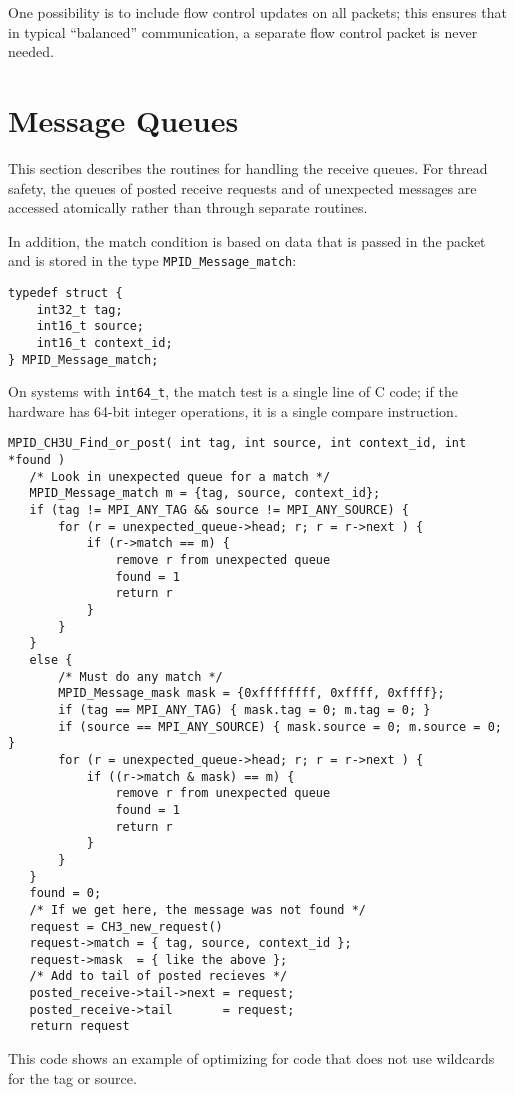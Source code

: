\documentclass{article}
\def\code{\begingroup\makeustext\eatcode}
\def\eatcode#1{\texttt{#1}\endgroup}
\begin{document}
One possibility is to include flow control updates on all packets; this
ensures that in typical ``balanced'' communication, a separate flow control
packet is never needed.  

\section{Message Queues}
This section describes the routines for handling the receive queues.  For
thread safety, the queues of posted receive requests and of unexpected
messages are accessed atomically rather than through separate routines.

In addition, the match condition is based on data that is passed in the packet
and is stored in the type \code{MPID_Message_match}:
\begin{verbatim}
typedef struct {
    int32_t tag;
    int16_t source;
    int16_t context_id;
} MPID_Message_match;
\end{verbatim}

On systems with \code{int64_t}, the match test is a single line of C code; if
the hardware has 64-bit integer operations, it is a single compare
instruction.  
\begin{verbatim}
MPID_CH3U_Find_or_post( int tag, int source, int context_id, int *found )
   /* Look in unexpected queue for a match */
   MPID_Message_match m = {tag, source, context_id};
   if (tag != MPI_ANY_TAG && source != MPI_ANY_SOURCE) {
       for (r = unexpected_queue->head; r; r = r->next ) {
           if (r->match == m) {
               remove r from unexpected queue
               found = 1
               return r
           }
       }
   }
   else {
       /* Must do any match */
       MPID_Message_mask mask = {0xffffffff, 0xffff, 0xffff};
       if (tag == MPI_ANY_TAG) { mask.tag = 0; m.tag = 0; }
       if (source == MPI_ANY_SOURCE) { mask.source = 0; m.source = 0; }
       for (r = unexpected_queue->head; r; r = r->next ) {
           if ((r->match & mask) == m) {
               remove r from unexpected queue
               found = 1
               return r
           }
       }
   }
   found = 0;
   /* If we get here, the message was not found */
   request = CH3_new_request()
   request->match = { tag, source, context_id };
   request->mask  = { like the above };
   /* Add to tail of posted recieves */
   posted_receive->tail->next = request;
   posted_receive->tail       = request;
   return request
\end{verbatim}
This code shows an example of optimizing for code that does not use wildcards
for the tag or source.  
\end{document}
